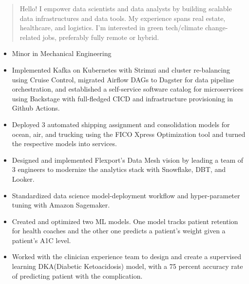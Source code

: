 \documentclass[10pt,a4paper,ragged2e,withhyper]{altacv}
\begin{document}
\begin{paracol}{2}
    \begin{quote}
        Hello! I empower data scientists and data analysts by building scalable data infrastructures and data tools. My experience spans real estate, healthcare, and logistics. I’m interested in green tech/climate change-related jobs, preferably fully remote or hybrid.
    \end{quote}
    \begin{itemize}
        \item Minor in Mechanical Engineering
    \end{itemize}
    \begin{itemize}
        \item Implemented Kafka on Kubernetes with Strimzi and cluster re-balancing using Cruise Control, migrated Airflow DAGs to Dagster for data pipeline orchestration, and established a self-service software catalog for microservices using Backstage with full-fledged CICD and infrastructure provisioning in Github Actions.
        \item Deployed 3 automated shipping assignment and consolidation models for ocean, air, and trucking using the FICO Xpress Optimization tool and turned the respective models into services.
        \item Designed and implemented Flexport's Data Mesh vision by leading a team of 3 engineers to modernize the analytics stack with Snowflake, DBT, and Looker.
    \end{itemize}
    \divider

    \begin{itemize}
        \item Standardized data science model-deployment workflow and hyper-parameter tuning with Amazon Sagemaker.
        \item Created and optimized two ML models. One model tracks patient retention for health coaches and the other one predicts a patient’s weight given a patient’s A1C level.
        \item Worked with the clinician experience team to design and create a supervised learning DKA(Diabetic Ketoacidosis) model, with a 75 percent accuracy rate of predicting patient with the complication.
    \end{itemize}
\end{paracol}
\end{document}

